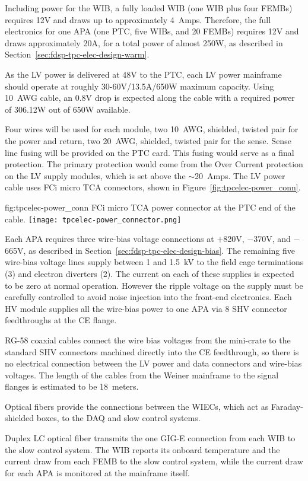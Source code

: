 Including power for the WIB, a fully loaded WIB (one WIB plus four FEMBs) requires
12V and draws up to approximately 4~Amps. Therefore, the full electronics for one APA (one PTC, five WIBs, and 20 FEMBs) 
requires 12V and draws approximately 20A, for a total power of almost 250W, as 
described in Section~\ref{sec:fdsp-tpc-elec-design-warm}.

As the LV power is delivered at 48V to the PTC, each LV power mainframe should 
operate at roughly 30-60V/13.5A/650W maximum capacity. Using 10~AWG cable, an 0.8V drop is expected along the cable with a
required power of 306.12W out of 650W available. 

Four wires will be used for each module, two 10~AWG,
shielded, twisted pair for the power and return, two 20~AWG, shielded, twisted pair for the sense. Sense line fusing will be
provided on the PTC card. This fusing would serve as
a final protection. The primary protection would come from the Over Current protection
on the LV supply modules, which is set above the $\sim$20~Amps. The LV power cable uses FCi micro TCA connectors, 
shown in Figure~\ref{fig:tpcelec-power_conn}.

\begin{dunefigure}
{fig:tpcelec-power_conn}
{FCi micro TCA power connector at the PTC end of the cable.}
\texttt{[image: tpcelec-power\_connector.png]}
\end{dunefigure}

Each APA requires three wire-bias voltage connections 
at $+$820V, $-$370V, and $-$665V, as described in Section~\ref{sec:fdsp-tpc-elec-design-bias}.
The remaining five wire-bias voltage lines supply between 1 and 1.5~kV to the field cage terminations (3)
and electron diverters (2).
The current on each of these supplies is expected to be zero at normal operation.
However the ripple voltage on the supply must be carefully controlled 
to avoid noise injection into the front-end electronics. Each HV module supplies all the wire-bias power to one APA via
8 SHV connector feedthroughs at the CE flange.

RG-58 coaxial cables connect the wire bias voltages from the mini-crate to the standard SHV
connectors machined directly into the CE feedthrough, so there is no electrical connection between 
the LV power and data connectors and wire-bias voltages. The length of the cables from the Weiner mainframe
to the signal flanges is estimated to be 18~meters.


Optical fibers provide the connections between the WIECs, which act as
Faraday-shielded boxes, to the DAQ and slow control systems.

Duplex LC optical fiber transmits the one GIG-E connection from each
WIB to the slow control system. The WIB reports its onboard temperature and the current draw from each FEMB to the slow control system, while the 
current draw for each APA is monitored at the mainframe itself.

